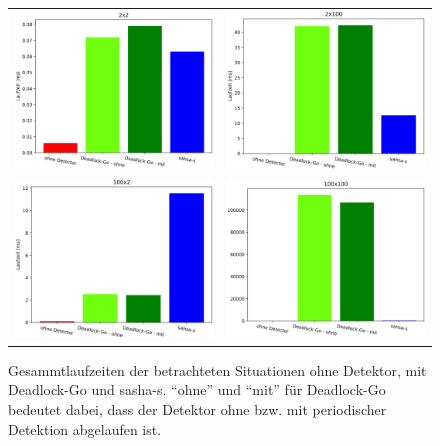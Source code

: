 \begin{figure}[H]
\begin{tabular}{cc}
    \includegraphics[width=.47\textwidth]{img/2x2.eps} & \includegraphics[width=.47\textwidth]{img/2x100.eps}\\
    \includegraphics[width=.47\textwidth]{img/100x2.eps} & \includegraphics[width=.47\textwidth]{img/100x100.eps}\\
\end{tabular}
\caption{Gesammtlaufzeiten der betrachteten Situationen ohne Detektor, mit Deadlock-Go und sasha-s. 
    ``ohne'' und ``mit''
    für Deadlock-Go bedeutet dabei, dass der Detektor ohne bzw. mit periodischer 
    Detektion abgelaufen ist.}
\end{figure}
